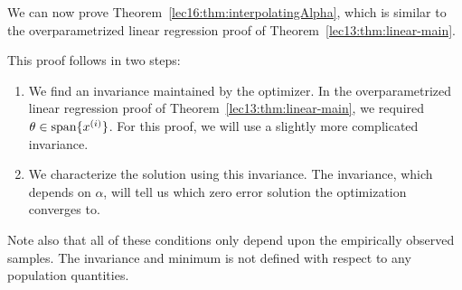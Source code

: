 We can now prove Theorem~\ref{lec16:thm:interpolatingAlpha}, which is similar to the overparametrized linear regression proof of Theorem~\ref{lec13:thm:linear-main}.

This proof follows in two steps:
\begin{enumerate}
\item We find an invariance maintained by the optimizer. In the overparametrized linear regression proof of Theorem~\ref{lec13:thm:linear-main}, we required $\theta \in \text{span}\{x\sp{i}\}$.  For this proof, we will use a slightly more complicated invariance.
\item We characterize the solution using this invariance.  The invariance, which depends on $\alpha$, will tell us which zero error solution the optimization converges to.
\end{enumerate}
Note also that all of these conditions only depend upon the empirically observed samples. The invariance and minimum is not defined with respect to any population quantities.
